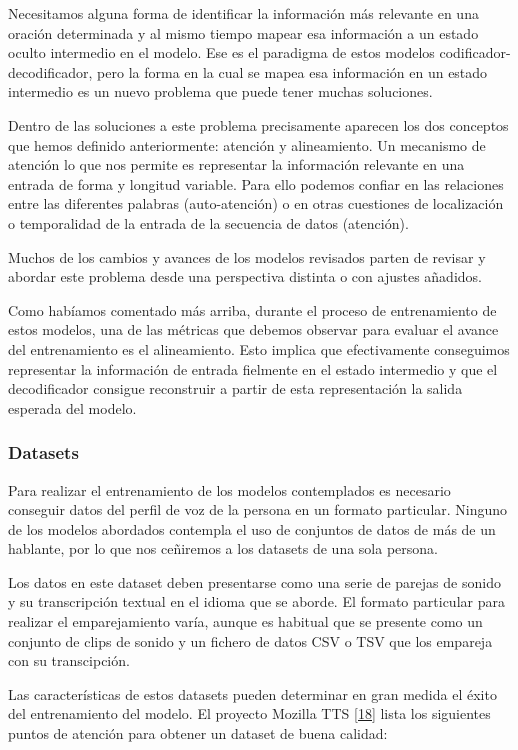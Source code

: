 Necesitamos alguna forma de identificar la información más relevante en una oración determinada y al mismo tiempo mapear esa información a un estado oculto intermedio en el modelo. Ese es el paradigma de estos modelos codificador-decodificador, pero la forma en la cual se mapea esa información en un estado intermedio es un nuevo problema que puede tener muchas soluciones.

Dentro de las soluciones a este problema precisamente aparecen los dos conceptos que hemos definido anteriormente: atención y alineamiento. Un mecanismo de atención lo que nos permite es representar la información relevante en una entrada de forma y longitud variable. Para ello podemos confiar en las relaciones entre las diferentes palabras (auto-atención) o en otras cuestiones de localización o temporalidad de la entrada de la secuencia de datos (atención).

Muchos de los cambios y avances de los modelos revisados parten de revisar y abordar este problema desde una perspectiva distinta o con ajustes añadidos. 

Como habíamos comentado más arriba, durante el proceso de entrenamiento de estos modelos, una de las métricas que debemos observar para evaluar el avance del entrenamiento es el alineamiento. Esto implica que efectivamente conseguimos representar la información de entrada fielmente en el estado intermedio y que el decodificador consigue reconstruir a partir de esta representación la salida esperada del modelo.

\subsubsection{Datasets}

Para realizar el entrenamiento de los modelos contemplados es necesario conseguir datos del perfil de voz de la persona en un formato particular. Ninguno de los modelos abordados contempla el uso de conjuntos de datos de más de un hablante, por lo que nos ceñiremos a los datasets de una sola persona.

Los datos en este dataset deben presentarse como una serie de parejas de sonido y su transcripción textual en el idioma que se aborde. El formato particular para realizar el emparejamiento varía, aunque es habitual que se presente como un conjunto de clips de sonido y un fichero de datos CSV o TSV que los empareja con su transcipción.

Las características de estos datasets pueden determinar en gran medida el éxito del entrenamiento del modelo. El proyecto Mozilla TTS \hyperref[RES_4]{[18]} lista los siguientes puntos de atención para obtener un dataset de buena calidad:

